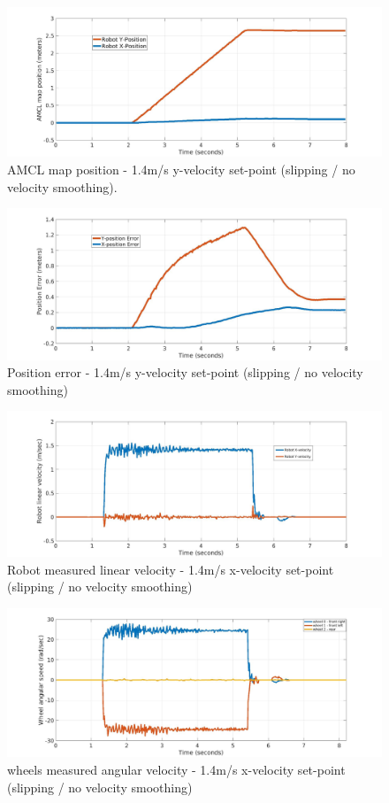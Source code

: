 \begin{figure}[H]
	\centering
	\includegraphics[width=12cm]{images/03-foundation/amcl14y}
	\caption{AMCL map position - 1.4m/s y-velocity set-point (slipping / no velocity smoothing).} 
	\label{amcl14y}
\end{figure}

\begin{figure}[H]
	\centering
	\includegraphics[width=12cm]{images/03-foundation/poserror14y}
	\caption{Position error - 1.4m/s y-velocity set-point (slipping / no velocity smoothing)} 
	\label{poserror14y}
\end{figure}

\begin{figure}[H]
	\centering
	\includegraphics[width=12cm]{images/03-foundation/vel14}
	\caption{Robot measured linear velocity - 1.4m/s x-velocity set-point (slipping / no velocity smoothing)} 
	\label{vel14}
\end{figure}

\begin{figure}[H]
	\centering
	\includegraphics[width=12cm]{images/03-foundation/wheel14}
	\caption{wheels measured angular velocity - 1.4m/s x-velocity set-point (slipping / no velocity smoothing)} 
	\label{wheel14}
\end{figure}

